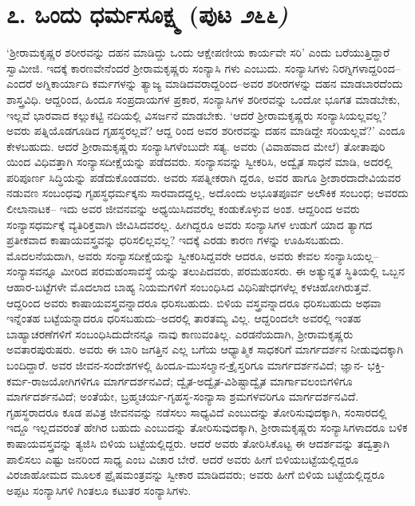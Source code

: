 \section{೭. ಒಂದು ಧರ್ಮಸೂಕ್ಷ್ಮ (ಪುಟ \textit{೨೬೬)}}

‘ಶ್ರೀರಾಮಕೃಷ್ಣರ ಶರೀರವನ್ನು ದಹನ ಮಾಡಿದ್ದು ಒಂದು ಆಕ್ಷೇಪಣೀಯ ಕಾರ್ಯವೇ ಸರಿ’ ಎಂದು ಬರೆಯುತ್ತಿದ್ದಾರೆ ಸ್ವಾಮೀಜಿ. ಇದಕ್ಕೆ ಕಾರಣವೇನೆಂದರೆ ಶ್ರೀರಾಮಕೃಷ್ಣರು ಸಂನ್ಯಾಸಿ ಗಳು ಎಂಬುದು. ಸಂನ್ಯಾಸಿಗಳು ನಿರಗ್ನಿಗಳಾದ್ದರಿಂದ–ಎಂದರೆ ಅಗ್ನಿಕಾರ್ಯಾದಿ ಕರ್ಮಗಳನ್ನು ತ್ಯಾಜ್ಯ ಮಾಡಿದವರಾದ್ದರಿಂದ–ಅವರ ಶರೀರಗಳನ್ನು ದಹನ ಮಾಡಬಾರದೆಂದು ಶಾಸ್ತ್ರವಿಧಿ. ಆದ್ದರಿಂದ, ಹಿಂದೂ ಸಂಪ್ರದಾಯಗಳ ಪ್ರಕಾರ, ಸಂನ್ಯಾಸಿಗಳ ಶರೀರವನ್ನು ಒಂದೋ ಭೂಗತ ಮಾಡಬೇಕು, ಇಲ್ಲವೆ ಭಾರವಾದ ಕಲ್ಲುಕಟ್ಟಿ ನದಿಯಲ್ಲಿ ವಿಸರ್ಜನೆ ಮಾಡಬೇಕು. ‘ಆದರೆ ಶ್ರೀರಾಮಕೃಷ್ಣರು ಸಂನ್ಯಾಸಿಯಲ್ಲವಲ್ಲ? ಅವರು ಪತ್ನಿಯೊಡಗೂಡಿದ ಗೃಹಸ್ಥರಲ್ಲವೆ? ಆದ್ದ ರಿಂದ ಅವರ ಶರೀರವನ್ನು ದಹನ ಮಾಡಿದ್ದೇ ಸರಿಯಲ್ಲವೆ?’ ಎಂದೂ ಕೇಳಬಹುದು. ಆದರೆ ಶ್ರೀರಾಮಕೃಷ್ಣರು ಸಂನ್ಯಾಸಿಗಳೆಂಬುದೇ ಸತ್ಯ. ಅವರು (ವಿವಾಹವಾದ ಮೇಲೆ) ತೋತಾಪುರಿ ಯಿಂದ ವಿಧಿವತ್ತಾಗಿ ಸಂನ್ಯಾಸದೀಕ್ಷೆಯನ್ನು ಪಡೆದವರು. ಸಂನ್ಯಾಸವನ್ನು ಸ್ವೀಕರಿಸಿ, ಅದ್ವೈತ ಸಾಧನೆ ಮಾಡಿ, ಅದರಲ್ಲಿ ಪರಿಪೂರ್ಣ ಸಿದ್ಧಿಯನ್ನು ಪಡೆದುಕೊಂಡವರು. ಅವರು ಸಪತ್ನೀಕರಾಗಿ ದ್ದರೂ, ಅವರ ಹಾಗೂ ಶ್ರೀಶಾರದಾದೇವಿಯವರ ನಡುವಣ ಸಂಬಂಧವು ಗೃಹಸ್ಥಧರ್ಮಕ್ಕನು ಸಾರವಾದದ್ದಲ್ಲ, ಅದೊಂದು ಅಭೂತಪೂರ್ವ ಅಲೌಕಿಕ ಸಂಬಂಧ; ಅವರದು ಲೀಲಾನಾಟಕ– ಇದು ಅವರ ಜೀವನವನ್ನು ಅಧ್ಯಯಿಸಿದವರೆಲ್ಲ ಕಂಡುಕೊಳ್ಳುವ ಅಂಶ. ಆದ್ದರಿಂದ ಅವರು ಸಂನ್ಯಾಸಧರ್ಮಕ್ಕೆ ವ್ಯತಿರಿಕ್ತವಾಗಿ ಜೀವಿಸಿದವರಲ್ಲ. ಹೀಗಿದ್ದರೂ ಅವರು ಸಂನ್ಯಾಸಿಗಳ ಉಡುಗೆ ಯಾದ ತ್ಯಾಗದ ಪ್ರತೀಕವಾದ ಕಾಷಾಯವಸ್ತ್ರವನ್ನು ಧರಿಸಲಿಲ್ಲವಲ್ಲ? ಇದಕ್ಕೆ ಎರಡು ಕಾರಣ ಗಳನ್ನು ಊಹಿಸಬಹುದು. ಮೊದಲನೆಯದಾಗಿ, ಅವರು ಸಂನ್ಯಾಸದೀಕ್ಷೆಯನ್ನು ಸ್ವೀಕರಿಸಿದ್ದವರೇ ಆದರೂ, ಅವರು ಕೇವಲ ಸಂನ್ಯಾಸಿಯಲ್ಲ–ಸಂನ್ಯಾಸವನ್ನೂ ಮೀರಿದ ಪರಮಹಂಸಾವಸ್ಥೆ ಯನ್ನು ತಲುಪಿದವರು, ಪರಮಹಂಸರು. ಈ ಅತ್ಯುನ್ನತ ಸ್ಥಿತಿಯಲ್ಲಿ ಒಬ್ಬನ ಆಹಾರ-ಬಟ್ಟೆಗಳೇ ಮೊದಲಾದ ಬಾಹ್ಯ ನಿಯಮಗಳಿಗೆ ಸಂಬಂಧಿಸಿದ ವಿಧಿನಿಷೇಧಗಳೆಲ್ಲ ಕಳಚಿಹೋಗಿರುತ್ತವೆ. ಆದ್ದರಿಂದ ಅವರು ಕಾಷಾಯವಸ್ತ್ರವನ್ನಾದರೂ ಧರಿಸಬಹುದು. ಬಿಳಿಯ ವಸ್ತ್ರವನ್ನಾದರೂ ಧರಿಸಬಹುದು ಅಥವಾ ಇನ್ನೆಂತಹ ಬಟ್ಟೆಯನ್ನಾದರೂ ಧರಿಸಬಹುದು–ಅದರಲ್ಲಿ ತಾರತಮ್ಯ ವಿಲ್ಲ. ಆದ್ದರಿಂದಲೇ ಅವರಲ್ಲಿ ಇಂತಹ ಬಾಹ್ಯಾಚರಣೆಗಳಿಗೆ ಸಂಬಂಧಿಸಿದುದೇನನ್ನೂ ನಾವು ಕಾಣುವಂತಿಲ್ಲ. ಎರಡನೆಯದಾಗಿ, ಶ್ರೀರಾಮಕೃಷ್ಣರು ಅವತಾರಪುರುಷರು. ಅವರು ಈ ಬಾರಿ ಜಗತ್ತಿನ ಎಲ್ಲ ಬಗೆಯ ಆಧ್ಯಾತ್ಮಿಕ ಸಾಧಕರಿಗೆ ಮಾರ್ಗದರ್ಶನ ನೀಡುವುದಕ್ಕಾಗಿ ಬಂದಿದ್ದಾರೆ. ಅವರ ಜೀವನ-ಸಂದೇಶಗಳಲ್ಲಿ ಹಿಂದೂ-ಮುಸಲ್ಮಾನ-ಕ್ರೈಸ್ತರಿಗೂ ಮಾರ್ಗದರ್ಶನವಿದೆ; ಜ್ಞಾನ- ಭಕ್ತಿ-ಕರ್ಮ-ರಾಜಯೋಗಿಗಳಿಗೂ ಮಾರ್ಗದರ್ಶನವಿದೆ; ದ್ವೈತ-ಅದ್ವೈತ-ವಿಶಿಷ್ಟಾದ್ವೈತ ಮಾರ್ಗಾವಲಂಬಿಗಳಿಗೂ ಮಾರ್ಗದರ್ಶನವಿದೆ; ಅಂತೆಯೇ, ಬ್ರಹ್ಮಚರ್ಯ-ಗೃಹಸ್ಥ-ಸಂನ್ಯಾಸಾ ಶ್ರಮಗಳವರಿಗೂ ಮಾರ್ಗದರ್ಶನವಿದೆ. ಗೃಹಸ್ಥರಾದರೂ ಕೂಡ ಪವಿತ್ರ ಜೀವನವನ್ನು ನಡೆಸಲು ಸಾಧ್ಯವಿದೆ ಎಂಬುದನ್ನು ತೋರಿಸುವುದಕ್ಕಾಗಿ, ಸಂಸಾರದಲ್ಲಿ ಇದ್ದೂ ಇಲ್ಲದವರಂತೆ ಹೇಗಿರ ಬಹುದು ಎಂಬುದನ್ನು ತೋರಿಸುವುದಕ್ಕಾಗಿ, ಶ್ರೀರಾಮಕೃಷ್ಣರು ಸಂನ್ಯಾಸಿಗಳಾದರೂ ಬಳಿಕ ಕಾಷಾಯವಸ್ತ್ರವನ್ನು ತ್ಯಜಿಸಿ ಬಿಳಿಯ ಬಟ್ಟೆಯಲ್ಲಿದ್ದರು. ಆದರೆ ಅವರು ತೋರಿಸಿಕೊಟ್ಟ ಈ ಆದರ್ಶವನ್ನು ತದ್ವತ್ತಾಗಿ ಪಾಲಿಸಲು ಎಷ್ಟು ಜನರಿಂದ ಸಾಧ್ಯ ಎಂಬ ವಿಚಾರ ಬೇರೆ. ಆದರೆ ಅವರು ಹೀಗೆ ಬಿಳಿಯಬಟ್ಟೆಯಲ್ಲಿದ್ದರೂ ವಿರಜಾಹೋಮದ ಮೂಲಕ ಪ್ರೈಷಮಂತ್ರವನ್ನು ಸ್ವೀಕಾರ ಮಾಡಿದವರು; ಅವರು ಹೀಗೆ ಬಿಳಿಯ ಬಟ್ಟೆಯಲ್ಲಿದ್ದರೂ ಅಪ್ಪಟ ಸಂನ್ಯಾಸಿಗಳಿ ಗಿಂತಲೂ ಕಟುತರ ಸಂನ್ಯಾಸಿಗಳು.

